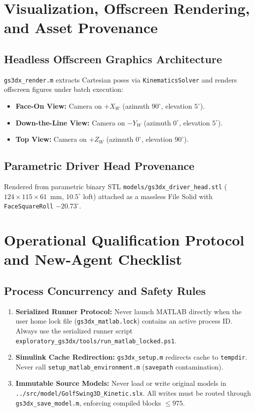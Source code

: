 \documentclass[11pt,a4paper]{article}
\begin{document}
\section{Visualization, Offscreen Rendering, and Asset Provenance}

\subsection{Headless Offscreen Graphics Architecture}
\texttt{gs3dx\_render.m} extracts Cartesian poses via \texttt{KinematicsSolver} and renders offscreen figures under batch execution:
\begin{itemize}
    \item \textbf{Face-On View:} Camera on $+X_W$ (azimuth $90^\circ$, elevation $5^\circ$).
    \item \textbf{Down-the-Line View:} Camera on $-Y_W$ (azimuth $0^\circ$, elevation $5^\circ$).
    \item \textbf{Top View:} Camera on $+Z_W$ (azimuth $0^\circ$, elevation $90^\circ$).
\end{itemize}

\subsection{Parametric Driver Head Provenance}
Rendered from parametric binary STL \texttt{models/gs3dx\_driver\_head.stl} ($124 \times 115 \times 61$~mm, $10.5^\circ$ loft) attached as a massless File Solid with \texttt{FaceSquareRoll} $-20.73^\circ$.

\section{Operational Qualification Protocol and New-Agent Checklist}

\subsection{Process Concurrency and Safety Rules}
\begin{enumerate}
    \item \textbf{Serialized Runner Protocol:} Never launch MATLAB directly when the user home lock file (\texttt{gs3dx\_matlab.lock}) contains an active process ID. Always use the serialized runner script \texttt{exploratory\_gs3dx/tools/run\_matlab\_locked.ps1}.
    \item \textbf{Simulink Cache Redirection:} \texttt{gs3dx\_setup.m} redirects cache to \texttt{tempdir}. Never call \texttt{setup\_matlab\_environment.m} (\texttt{savepath} contamination).
    \item \textbf{Immutable Source Models:} Never load or write original models in \nolinkurl{../src/model/GolfSwing3D_Kinetic.slx}. All writes must be routed through \texttt{gs3dx\_save\_model.m}, enforcing compiled blocks $\le 975$.
\end{enumerate}
\end{document}
